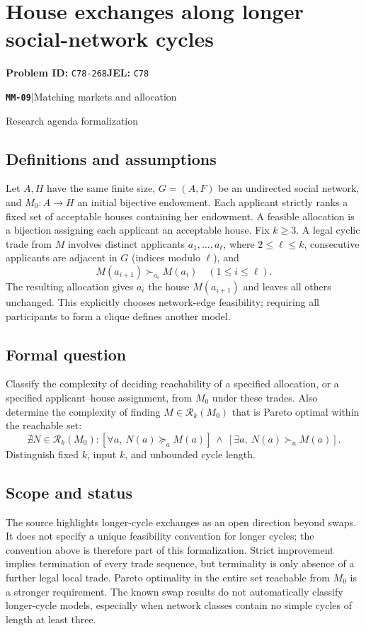 \documentclass[11pt,a4paper]{article}
\newcommand{\entrymeta}[3]{{\sffamily\small\color{muted}\textbf{\texttt{#1}}\quad|\quad #2\par #3\par}}
\begin{document}
\section*{House exchanges along longer social-network cycles}
\textbf{Problem ID:} \texttt{C78-268}\quad \textbf{JEL:} \texttt{C78}\par
\label{problem:OP-0550}
\label{beyond:MM-09}
\entrymeta{MM-09}{Matching markets and allocation}{Research agenda formalization}
\subsection*{Definitions and assumptions}
Let $A,H$ have the same finite size, $G=(A,F)$ be an undirected social network, and $M_0:A\to H$ an initial bijective endowment. Each applicant strictly ranks a fixed set of acceptable houses containing her endowment. A feasible allocation is a bijection assigning each applicant an acceptable house. Fix $k\ge3$. A legal cyclic trade from $M$ involves distinct applicants $a_1,\ldots,a_\ell$, where $2\le\ell\le k$, consecutive applicants are adjacent in $G$ (indices modulo $\ell$), and
\[
 M(a_{i+1})\succ_{a_i}M(a_i)\quad(1\le i\le\ell).
\]
The resulting allocation gives $a_i$ the house $M(a_{i+1})$ and leaves all others unchanged. This explicitly chooses network-edge feasibility; requiring all participants to form a clique defines another model.
\subsection*{Formal question}
Classify the complexity of deciding reachability of a specified allocation, or a specified applicant--house assignment, from $M_0$ under these trades. Also determine the complexity of finding $M\in\mathcal R_k(M_0)$ that is Pareto optimal within the reachable set:
\[
 \nexists N\in\mathcal R_k(M_0):
 [\forall a,\ N(a)\succeq_a M(a)]\ \land\
 [\exists a,\ N(a)\succ_a M(a)].
\]
Distinguish fixed $k$, input $k$, and unbounded cycle length.
\subsection*{Scope and status}
The source highlights longer-cycle exchanges as an open direction beyond swaps. It does not specify a unique feasibility convention for longer cycles; the convention above is therefore part of this formalization. Strict improvement implies termination of every trade sequence, but terminality is only absence of a further legal local trade. Pareto optimality in the entire set reachable from $M_0$ is a stronger requirement. The known swap results do not automatically classify longer-cycle models, especially when network classes contain no simple cycles of length at least three.
\end{document}
